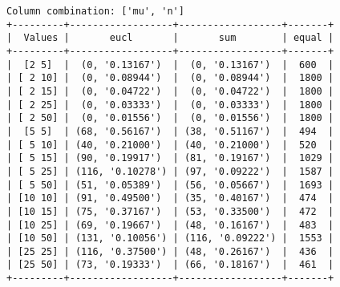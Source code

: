 \documentclass{article}
\begin{document}
\begin{verbatim}
Column combination: ['mu', 'n']
+---------+------------------+------------------+-------+
|  Values |       eucl       |       sum        | equal |
+---------+------------------+------------------+-------+
|  [2 5]  |  (0, '0.13167')  |  (0, '0.13167')  |  600  |
| [ 2 10] |  (0, '0.08944')  |  (0, '0.08944')  |  1800 |
| [ 2 15] |  (0, '0.04722')  |  (0, '0.04722')  |  1800 |
| [ 2 25] |  (0, '0.03333')  |  (0, '0.03333')  |  1800 |
| [ 2 50] |  (0, '0.01556')  |  (0, '0.01556')  |  1800 |
|  [5 5]  | (68, '0.56167')  | (38, '0.51167')  |  494  |
| [ 5 10] | (40, '0.21000')  | (40, '0.21000')  |  520  |
| [ 5 15] | (90, '0.19917')  | (81, '0.19167')  |  1029 |
| [ 5 25] | (116, '0.10278') | (97, '0.09222')  |  1587 |
| [ 5 50] | (51, '0.05389')  | (56, '0.05667')  |  1693 |
| [10 10] | (91, '0.49500')  | (35, '0.40167')  |  474  |
| [10 15] | (75, '0.37167')  | (53, '0.33500')  |  472  |
| [10 25] | (69, '0.19667')  | (48, '0.16167')  |  483  |
| [10 50] | (131, '0.10056') | (116, '0.09222') |  1553 |
| [25 25] | (116, '0.37500') | (48, '0.26167')  |  436  |
| [25 50] | (73, '0.19333')  | (66, '0.18167')  |  461  |
+---------+------------------+------------------+-------+
\end{verbatim}
\end{document}
